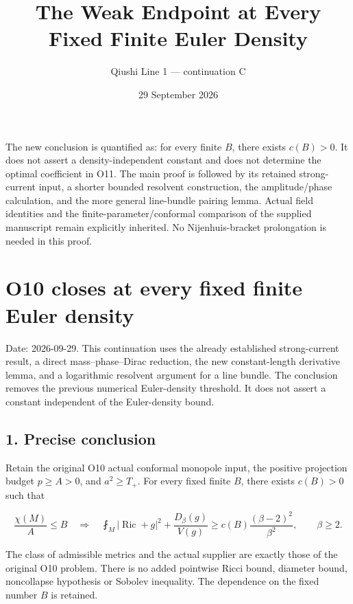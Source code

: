 \documentclass[11pt]{article}
\title{The Weak Endpoint at Every Fixed Finite Euler Density}
\author{Qiushi Line 1 --- continuation C}
\date{29 September 2026}
\begin{document}
\maketitle
\noindent The new conclusion is quantified as: for every finite $B$, there exists $c(B)>0$. It does not assert a density-independent constant and does not determine the optimal coefficient in O11. The main proof is followed by its retained strong-current input, a shorter bounded resolvent construction, the amplitude/phase calculation, and the more general line-bundle pairing lemma. Actual field identities and the finite-parameter/conformal comparison of the supplied manuscript remain explicitly inherited. No Nijenhuis-bracket prolongation is needed in this proof.
\tableofcontents
\clearpage
\hypertarget{o10-closes-at-every-fixed-finite-euler-density}{%
\section{O10 closes at every fixed finite Euler
density}\label{o10-closes-at-every-fixed-finite-euler-density}}

Date: 2026-09-29. This continuation uses the already established
strong-current result, a direct mass--phase--Dirac reduction, the new
constant-length derivative lemma, and a logarithmic resolvent argument
for a line bundle. The conclusion removes the previous numerical
Euler-density threshold. It does not assert a constant independent of
the Euler-density bound.

\hypertarget{precise-conclusion}{%
\subsection{1. Precise conclusion}\label{precise-conclusion}}

Retain the original O10 actual conformal monopole input, the positive
projection budget \(p\ge A>0\), and \(a^2\ge T_+\). For every fixed
finite \(B\), there exists \(c(B)>0\) such that

\[
 \boxed{\frac{\chi(M)}A\le B
 \quad\Longrightarrow\quad
 \fint_M|\operatorname{Ric}+g|^2+\frac{D_\beta(g)}{V(g)}
 \ge c(B)\frac{(\beta-2)^2}{\beta^2},\qquad\beta\ge2.}
\tag{1}
\]

The class of admissible metrics and the actual supplier are exactly
those of the original O10 problem. There is no added pointwise Ricci
bound, diameter bound, noncollapse hypothesis or Sobolev inequality. The
dependence on the fixed number \(B\) is retained.
\end{document}
